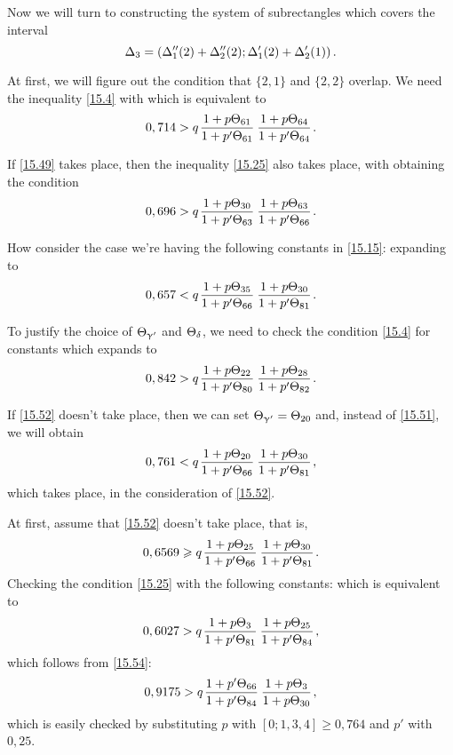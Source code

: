 Now we will turn to constructing the system of subrectangles which covers the interval
\begin{equation*}
	\Delta_3 = \left(
		\Delta_1''(2) + \Delta_2''(2);
		\Delta_1'(2) + \Delta_2'(1)
	\right).
\end{equation*}

At first, we will figure out the condition that $\{2, 1\}$ and $\{2, 2\}$ overlap.
We need the inequality \ref{15.4} with
which is equivalent to
\begin{equation}\label{15.49}
	0,714 > q \up{61}{61} \up{64}{64}.
\end{equation}

If \ref{15.49} takes place, then the inequality \ref{15.25} also takes place, with
obtaining the condition
\begin{equation}\label{15.50}
	0,696 > q \up{30}{63} \up{63}{66}.
\end{equation}

How consider the case we're having the following constants in \ref{15.15}:
expanding to
\begin{equation}\label{15.51}
	0,657 < q \up{35}{66} \up{30}{81}.
\end{equation}

To justify the choice of $\Theta_{\upgamma'}$ and $\Theta_{\delta}$, we need to check the condition \ref{15.4} for constants
which expands to
\begin{equation}\label{15.52}
	0,842 > q \up{22}{80} \up{28}{82}.
\end{equation}

If \ref{15.52} doesn't take place, then we can set $\Theta_{\upgamma'} = \Theta_{20}$ and, instead of \ref{15.51}, we will obtain
\begin{equation}\label{15.53}
	0,761 < q \up{20}{66} \up{30}{81},
\end{equation}
which takes place, in the consideration of \ref{15.52}.

At first, assume that \ref{15.52} doesn't take place, that is,
\begin{equation}\label{15.54}
	0,6569 \geqslant q \up{25}{66} \up{30}{81}.
\end{equation}
Checking the condition \ref{15.25} with the following constants:
which is equivalent to
\begin{equation*}
	0,6027 > q \up{3}{81} \up{25}{84},
\end{equation*}
which follows from \ref{15.54}:
\begin{equation*}
	0,9175 > q \pp{66}{84} \uu{3}{30},
\end{equation*}
which is easily checked by substituting $p$ with $[ 0; 1, 3, 4] \geqslant 0,764$ and $p'$ with $0,25$.

